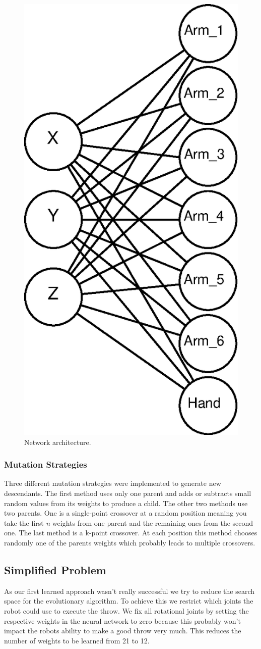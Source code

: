 \begin{figure}[h]
\centering
\includegraphics[width=.5\columnwidth]{figures/net.eps}
\caption{Network architecture.}
\label{fig:network}
\end{figure}

\subsubsection{Mutation Strategies}
Three different mutation strategies were implemented to generate new descendants.
The first method uses only one parent and adds or subtracts small random values from its weights to produce a child.
The other two methods use two parents.
One is a single-point crossover at a random position meaning you take the first \textit{n} weights from one parent and the remaining ones from the second one.
The last method is a k-point crossover.
At each position this method chooses randomly one of the parents weights which probably leads to multiple crossovers.

\subsection{Simplified Problem}
As our first learned approach wasn't really successful we try to reduce the search space for the evolutionary algorithm.
To achieve this we restrict which joints the robot could use to execute the throw.
We fix all rotational joints by setting the respective weights in the neural network to zero because this probably won't impact the robots ability to make a good throw very much.
This reduces the number of weights to be learned from 21 to 12.